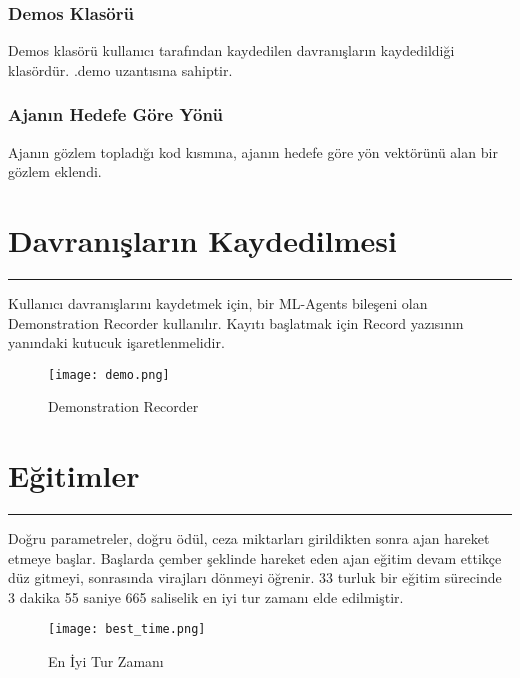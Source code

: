 \documentclass{article}
\begin{document}
\subsubsection{Demos Klasörü}
\par Demos klasörü kullanıcı tarafından kaydedilen davranışların kaydedildiği klasördür. .demo uzantısına sahiptir. \\[5pt]

\subsubsection{Ajanın Hedefe Göre Yönü}
\par Ajanın gözlem topladığı kod kısmına, ajanın hedefe göre yön vektörünü alan bir gözlem eklendi\cite{dir}. \\[5pt]

\newpage

\section{Davranışların Kaydedilmesi}
\rule{\textwidth}{0.5pt}
\par Kullanıcı davranışlarını kaydetmek için, bir ML-Agents bileşeni olan Demonstration Recorder kullanılır. Kayıtı başlatmak için Record yazısının yanındaki kutucuk işaretlenmelidir. \\[5pt]

\begin{figure}[h]
    \begin{center}
        \texttt{[image: demo.png]}
    \end{center}
      \caption{Demonstration Recorder}
\end{figure}

\vspace{5pt}

\section{Eğitimler}
\rule{\textwidth}{0.5pt}
\par Doğru parametreler, doğru ödül, ceza miktarları girildikten sonra ajan hareket etmeye başlar. Başlarda çember şeklinde hareket eden ajan eğitim devam ettikçe düz gitmeyi, sonrasında virajları dönmeyi öğrenir. 33 turluk bir eğitim sürecinde 3 dakika 55 saniye 665 saliselik en iyi tur zamanı elde edilmiştir. \\[5pt]
\begin{figure}[h]
    \begin{center}
        \texttt{[image: best\_time.png]}
    \end{center}
      \caption{En İyi Tur Zamanı}
\end{figure}
\end{document}
